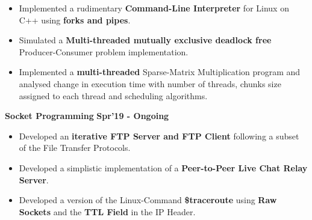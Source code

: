 \documentclass[10pt]{article}
\begin{document}
\begin{itemize}
    \item Implemented a rudimentary \textbf{Command-Line Interpreter} for Linux on C++ using \textbf{forks and pipes}. \\[-1.9em]
    \item Simulated a \textbf{Multi-threaded mutually exclusive deadlock free} Producer-Consumer problem implementation.\\[-1.9em]
    \item Implemented a \textbf{multi-threaded} Sparse-Matrix Multiplication program and analysed change in execution time with number of threads, chunks size assigned to each thread and scheduling algorithms.\\[-1em]
\end{itemize}
\vspace{-0.5ex}    
\large {\textbf{Socket Programming}} \normalsize \href{https://github.com/shmundhra/Socket-Programming}{\faGithub} {\hfill}\textbf{Spr'19 - Ongoing}\\[-1.7em]
\begin{itemize}
    \item Developed an \textbf{iterative FTP Server and FTP Client} following a subset of the File Transfer Protocols.\\[-1.9em] 
    \item Developed a simplistic implementation of a \textbf{Peer-to-Peer Live Chat Relay Server}.\\[-1.9em]
    \item Developed a version of the Linux-Command \textbf{\$traceroute} using \textbf{Raw Sockets} and the \textbf{TTL Field} in the IP Header.
\end{itemize}
\end{document}
